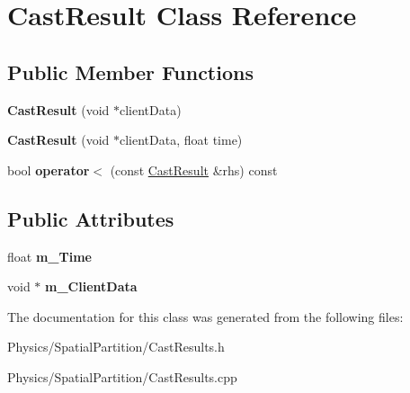 \hypertarget{classCastResult}{}\section{Cast\+Result Class Reference}
\label{classCastResult}
\subsection*{Public Member Functions}
\begin{DoxyCompactItemize}
\item 
\mbox{\label{classCastResult_a0bfa7f1f5b34b2a2c6846ab07e10584c}} 
{\bfseries Cast\+Result} (void $\ast$client\+Data)
\item 
\mbox{\label{classCastResult_aac9e9fc20559d0312a4a2b67472e21ad}} 
{\bfseries Cast\+Result} (void $\ast$client\+Data, float time)
\item 
\mbox{\label{classCastResult_aa93d9222beba3f31dafeba8761ab0979}} 
bool {\bfseries operator$<$} (const \hyperlink{classCastResult}{Cast\+Result} \&rhs) const
\end{DoxyCompactItemize}
\subsection*{Public Attributes}
\begin{DoxyCompactItemize}
\item 
\mbox{\label{classCastResult_a8bdd91efbc7ac7c3cee5692bb1cd12ff}} 
float {\bfseries m\+\_\+\+Time}
\item 
\mbox{\label{classCastResult_a05176a3b71d4958ba65e99c800ecadb3}} 
void $\ast$ {\bfseries m\+\_\+\+Client\+Data}
\end{DoxyCompactItemize}


The documentation for this class was generated from the following files\+:\begin{DoxyCompactItemize}
\item 
Physics/\+Spatial\+Partition/Cast\+Results.\+h\item 
Physics/\+Spatial\+Partition/Cast\+Results.\+cpp\end{DoxyCompactItemize}
